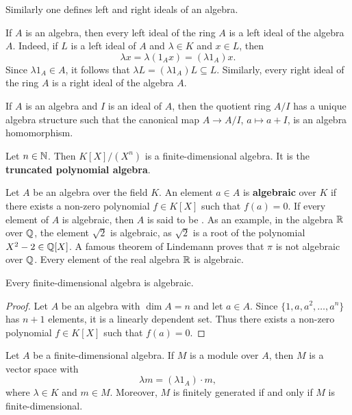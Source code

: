 Similarly one defines left and right ideals of an algebra.

If $A$ is an algebra, then every left ideal of the ring $A$ is a left ideal of the algebra $A$. Indeed, if $L$ is a left ideal of $A$ 
and $\lambda\in K$ and $x\in L$, then 
\[
	\lambda x=\lambda (1_Ax)=(\lambda 1_A)x.
\]
Since $\lambda 1_A\in A$, it follows that  $\lambda L=(\lambda
1_A)L\subseteq L$. Similarly, every right ideal of the ring $A$ is a right ideal of the algebra $A$.


If $A$ is an algebra and $I$ is an ideal of $A$, then the quotient ring $A/I$ has a unique algebra
structure such that the canonical map  
$A\to A/I$, $a\mapsto a+I$, is an algebra homomorphism. 

\begin{example}
Let $n\in\mathbb{N}$. Then $K[X]/(X^n)$ is a finite-dimensional algebra. It is the \textbf{truncated polynomial algebra}.  
\end{example}

Let $A$ be an algebra over the field $K$. An element $a\in A$ is 
\textbf{algebraic} over $K$ if there exists a non-zero polynomial $f\in K[X]$
such that $f(a)=0$. If every element of $A$ is algebraic, then $A$ is said to be . As an example, in 
the algebra $\mathbb{R}$ over $\mathbb{Q}$, the element $\sqrt{2}$ is algebraic, as $\sqrt{2}$ is a root of the polynomial $X^2-2\in\mathbb{Q}[X]$. A famous theorem of Lindemann proves that   
$\pi$ is not algebraic over $\mathbb{Q}$. Every element of the real algebra $\mathbb{R}$ is algebraic.

\begin{proposition}
	\label{lem:algebraic}
	Every finite-dimensional algebra is algebraic.
\end{proposition}

\begin{proof}
   Let $A$ be an algebra with $\dim A=n$ and let $a\in A$. Since  
	$\{1,a,a^2,\dots,a^n\}$ has $n+1$ elements, it is a linearly dependent set. Thus there exists 
	a non-zero polynomial $f\in K[X]$ such that $f(a)=0$.
\end{proof}

Let $A$ be a finite-dimensional algebra. If $M$ is a module over $A$, then $M$ is a vector space with  
\[
\lambda m=(\lambda 1_A)\cdot m, 
\]
where 
$\lambda\in K$ and $m\in M$. 
Moreover, $M$ is finitely generated if and only if $M$ is finite-dimensional.  

